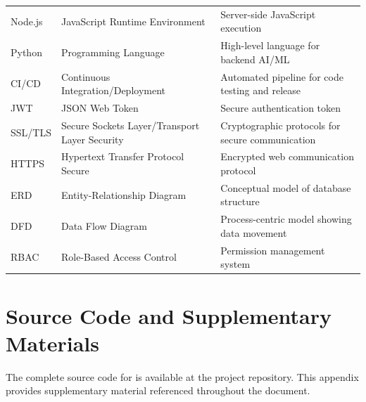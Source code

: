 \documentclass[11pt,a4paper,twoside]{report}
\begin{document}
\begin{longtable}{p{3cm}p{5cm}p{6cm}}
Node.js & JavaScript Runtime Environment & Server-side JavaScript execution \\
Python & Programming Language & High-level language for backend AI/ML \\
CI/CD & Continuous Integration/Deployment & Automated pipeline for code testing and release \\
JWT & JSON Web Token & Secure authentication token \\
SSL/TLS & Secure Sockets Layer/Transport Layer Security & Cryptographic protocols for secure communication \\
HTTPS & Hypertext Transfer Protocol Secure & Encrypted web communication protocol \\
ERD & Entity-Relationship Diagram & Conceptual model of database structure \\
DFD & Data Flow Diagram & Process-centric model showing data movement \\
RBAC & Role-Based Access Control & Permission management system \\
\bottomrule
\end{longtable}
\newpage









\renewcommand{\bibname}{References}



\appendix
{}
\chapter*{Source Code and Supplementary Materials}
\label{app:code}

The complete source code for \projectname{} is available at the project repository. This appendix provides supplementary material referenced throughout the document.
\end{document}
